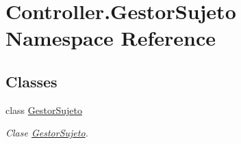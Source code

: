 \hypertarget{namespace_controller_1_1_gestor_sujeto}{}\section{Controller.\+Gestor\+Sujeto Namespace Reference}
\label{namespace_controller_1_1_gestor_sujeto}
\subsection*{Classes}
\begin{DoxyCompactItemize}
\item 
class \hyperlink{class_controller_1_1_gestor_sujeto_1_1_gestor_sujeto}{Gestor\+Sujeto}
\begin{DoxyCompactList}\small\item\em Clase \hyperlink{class_controller_1_1_gestor_sujeto_1_1_gestor_sujeto}{Gestor\+Sujeto}. \end{DoxyCompactList}\end{DoxyCompactItemize}
